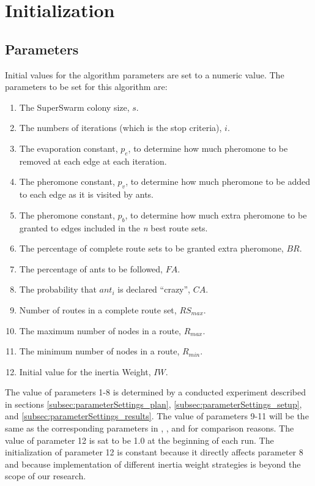 \section{Initialization}
\label{sec:algoInitialization}
\subsection{Parameters}
Initial values for the algorithm parameters are set to a numeric value. The parameters to be set for this algorithm are:
\begin{enumerate}
\item The SuperSwarm colony size, $s$. 
\item The numbers of iterations (which is the stop criteria), $i$.
\item The evaporation constant, $p_e$, to determine how much pheromone to be removed at each edge at each iteration.
\item The pheromone constant, $p_v$, to determine how much pheromone to be added to each edge as it is visited by ants.
\item The pheromone constant, $p_b$, to determine how much extra pheromone to be granted to edges included in the \textit{n} best route sets.
\item The percentage of complete route sets to be granted extra pheromone, $BR$.
\item The percentage of ants to be followed, $FA$.
\item The probability that $ant_i$ is declared ``crazy'', $CA$.
\item Number of routes in a complete route set, $RS_{max}$. 
\item The maximum number of nodes in a route, $R_{max}$.
\item The minimum number of nodes in a route, $R_{min}$.
\item Initial value for the inertia Weight, $IW$.
\end{enumerate}
The value of parameters 1-8 is determined by a conducted experiment described in sections \vref{subsec:parameterSettings_plan}, \vref{subsec:parameterSettings_setup}, and \vref{subsec:parameterSettings_results}. The value of parameters 9-11 will be the same as the corresponding parameters in \citet{mandl79}, \citet{kechagiopoulos14}, and \citet{nikolic14} for comparison reasons. The value of parameter 12 is sat to be 1.0 at the beginning of each run. The initialization of parameter 12 is constant because it directly affects parameter 8 and because implementation of different inertia weight strategies is beyond the scope of our research.   

